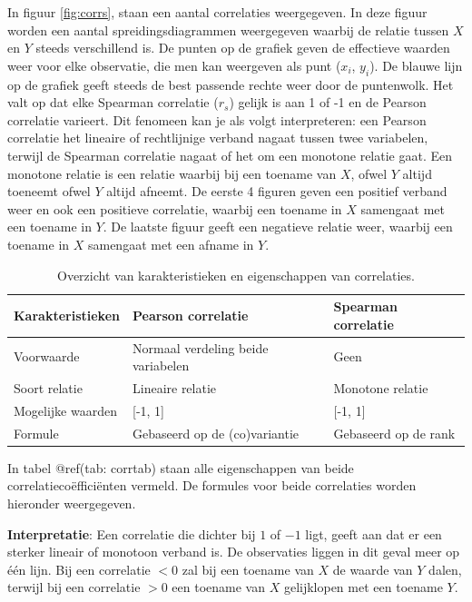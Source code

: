 \documentclass[
]{book}
\theoremstyle{definition}
\theoremstyle{definition}
\theoremstyle{definition}
\theoremstyle{definition}
\theoremstyle{remark}
\begin{document}
In figuur \ref{fig:corrs}, staan een aantal correlaties weergegeven. In deze figuur worden een aantal spreidingsdiagrammen weergegeven waarbij de relatie tussen \(X\) en \(Y\) steeds verschillend is. De punten op de grafiek geven de effectieve waarden weer voor elke observatie, die men kan weergeven als punt (\(x_i\), \(y_i\)). De blauwe lijn op de grafiek geeft steeds de best passende rechte weer door de puntenwolk. Het valt op dat elke Spearman correlatie (\(r_s\)) gelijk is aan 1 of -1 en de Pearson correlatie varieert. Dit fenomeen kan je als volgt interpreteren: een Pearson correlatie het lineaire of rechtlijnige verband nagaat tussen twee variabelen, terwijl de Spearman correlatie nagaat of het om een monotone relatie gaat. Een monotone relatie is een relatie waarbij bij een toename van \(X\), ofwel \(Y\) altijd toeneemt ofwel \(Y\) altijd afneemt. De eerste 4 figuren geven een positief verband weer en ook een positieve correlatie, waarbij een toename in \(X\) samengaat met een toename in \(Y\). De laatste figuur geeft een negatieve relatie weer, waarbij een toename in \(X\) samengaat met een afname in \(Y\).

\begin{table}

\caption{\label{tab:corrtab}Overzicht van karakteristieken en eigenschappen van correlaties.}
\centering
\begin{tabular}[t]{lll}
\toprule
Karakteristieken & Pearson correlatie & Spearman correlatie\\
\midrule
Voorwaarde & Normaal verdeling beide variabelen & Geen\\
Soort relatie & Lineaire relatie & Monotone relatie\\
Mogelijke waarden & {}[-1, 1] & {}[-1, 1]\\
Formule & Gebaseerd op de (co)variantie & Gebaseerd op de rank\\
\bottomrule
\end{tabular}
\end{table}

In tabel @ref(tab: corrtab) staan alle eigenschappen van beide correlatiecoëfficiënten vermeld. De formules voor beide correlaties worden hieronder weergegeven.

\textbf{Interpretatie}: Een correlatie die dichter bij \(1\) of \(-1\) ligt, geeft aan dat er een sterker lineair of monotoon verband is. De observaties liggen in dit geval meer op één lijn. Bij een correlatie \(< 0\) zal bij een toename van \(X\) de waarde van \(Y\) dalen, terwijl bij een correlatie \(> 0\) een toename van \(X\) gelijklopen met een toename \(Y\).
\end{document}

